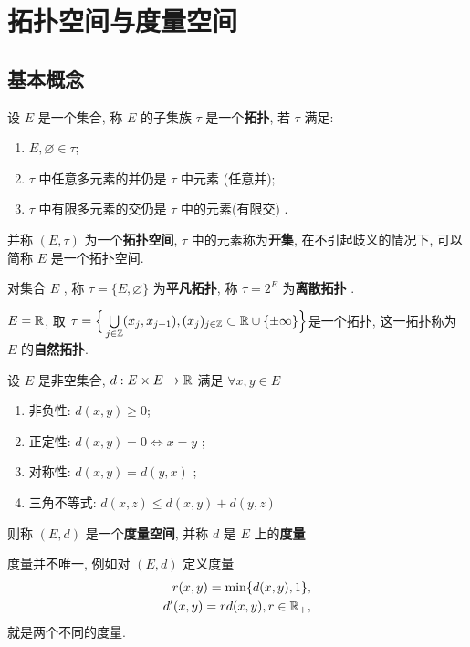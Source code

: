 \chapter{拓扑空间与度量空间}
\section{基本概念}

 \begin{Def}[拓扑空间]\label{def:拓扑空间}
      设 $ E $ 是一个集合, 称 $ E $ 的子集族 $ \tau $ 是一个\textbf{拓扑}, 若 $ \tau $ 满足: 
     \begin{enumerate}[(1)]
          \item $ E, \varnothing\in \tau $;
          \item $ \tau $ 中任意多元素的并仍是 $ \tau $ 中元素 (任意并);
          \item $ \tau $ 中有限多元素的交仍是 $ \tau $ 中的元素(有限交) . 
     \end{enumerate}
     并称 $ (E, \tau) $ 为一个\textbf{拓扑空间}, $ \tau $ 中的元素称为\textbf{开集}, 在不引起歧义的情况下, 可以简称 $ E $ 是一个拓扑空间. 
 \end{Def}
 \begin{Rmk}\label{rmk:平凡离散}
      对集合 $ E $ , 称 $ \tau=\{ E, \varnothing \} $ 为\textbf{平凡拓扑}, 称 $ \tau=2^{E} $ 为\textbf{离散拓扑} . 
 \end{Rmk}
 \begin{Ex}
      $ E=\mathbb{R} $, 取 $ \tau=\Big\{ \bigcup\limits_{j\in\mathbb{Z}}(x_{j}, x_{j+1}), (x_{j})_{j\in\mathbb{Z}}\subset \mathbb{R}\cup\{ \pm\infty \} \Big\} $是一个拓扑, 这一拓扑称为 $ E $ 的\textbf{自然拓扑}. 
 \end{Ex}
 \begin{Def}[度量空间]\label{def:度量空间}
      设 $ E $ 是非空集合, $ d: E\times E\to \mathbb{R} $ 满足 $ \forall x, y\in E $
      \begin{enumerate}[(1)]
           \item 非负性: $ d(x, y)\geqslant 0 $;
           \item 正定性: $ d(x, y)=0\Longleftrightarrow x=y $ ;
           \item 对称性: $ d(x, y)=d(y, x) $ ;
           \item 三角不等式: $ d(x, z)\leqslant d(x, y)+d(y, z) $ 
      \end{enumerate}
      则称 $ (E, d) $ 是一个\textbf{度量空间}, 并称 $ d $ 是 $ E $ 上的\textbf{度量}
 \end{Def}
 \begin{Rmk}\label{rmk:度量不唯一}
      度量并不唯一, 例如对 $ (E, d) $ 定义度量
      \begin{equation*}
          \begin{aligned}
               r(x, y) = \min\{ d(x, y), 1 \}, \\
               d'(x, y) = rd(x, y), r\in\mathbb{R}_{+},
          \end{aligned}
      \end{equation*}
      就是两个不同的度量. 
 \end{Rmk}
 
